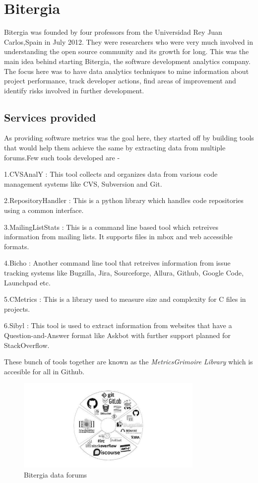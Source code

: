 \documentclass[seploa]{beavtex}
\begin{document}
\chapter{Bitergia}
Bitergia was founded by four professors from the 	
Universidad Rey Juan Carlos,Spain in July 2012. They were researchers who were very much involved in understanding the open source community and its growth for long. This was the main idea behind starting Bitergia, the software development analytics company. The focus here was to have data analytics techniques to mine information about project performance, track developer actions, find areas of improvement and identify risks involved in further development. 
\section{Services provided}
As providing software metrics was the goal here, they started off by building tools that would help them achieve the same by extracting data from multiple forums.Few such tools developed are - 

1.CVSAnalY : This tool collects and organizes data from various code management systems like CVS, Subversion and Git.

2.RepositoryHandler : This is a python library which handles code repositories using a common interface.

3.MailingListStats : This is a command line based tool which retreives information from mailing lists. It supports files in mbox and web accessible formats.

4.Bicho : Another command line tool that retreives information from issue tracking systems like Bugzilla, Jira, Sourceforge, Allura, Github, Google Code, Launchpad etc.

5.CMetrics : This is a library used to measure size and complexity for C files in projects.

6.Sibyl : This tool is used to extract information from websites that have a Question-and-Answer format like Askbot with further support planned for StackOverflow.

These bunch of tools together are known as the \emph{MetricsGrimoire Library} which is accesible for all in Github.

\begin{figure}[!ht]
\centering
\includegraphics[width=90mm]{bitergia.jpg}
\caption{Bitergia data forums}
\end{figure}
\end{document}
